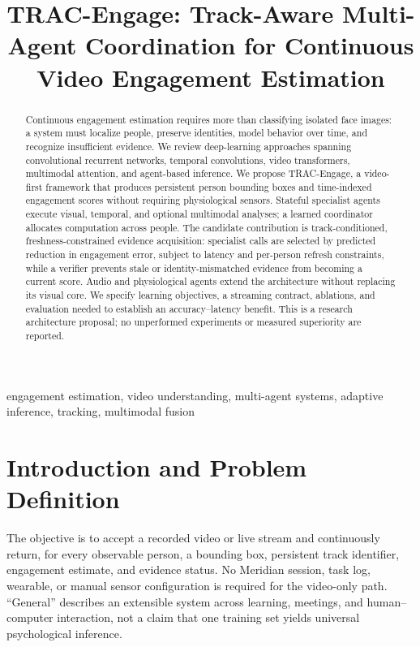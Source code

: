 \documentclass[a4paper,conference]{IEEEtran}
\title{TRAC-Engage: Track-Aware Multi-Agent Coordination for Continuous Video Engagement Estimation}
\author{\IEEEauthorblockN{Research Architecture Proposal}
\IEEEauthorblockA{Revised literature review and research implementation\\14 October 2026}}
\begin{document}
\maketitle
\begin{abstract}
Continuous engagement estimation requires more than classifying isolated face images: a system must localize people, preserve identities, model behavior over time, and recognize insufficient evidence. We review deep-learning approaches spanning convolutional recurrent networks, temporal convolutions, video transformers, multimodal attention, and agent-based inference. We propose TRAC-Engage, a video-first framework that produces persistent person bounding boxes and time-indexed engagement scores without requiring physiological sensors. Stateful specialist agents execute visual, temporal, and optional multimodal analyses; a learned coordinator allocates computation across people. The candidate contribution is track-conditioned, freshness-constrained evidence acquisition: specialist calls are selected by predicted reduction in engagement error, subject to latency and per-person refresh constraints, while a verifier prevents stale or identity-mismatched evidence from becoming a current score. Audio and physiological agents extend the architecture without replacing its visual core. We specify learning objectives, a streaming contract, ablations, and evaluation needed to establish an accuracy--latency benefit. This is a research architecture proposal; no unperformed experiments or measured superiority are reported.
\end{abstract}
\begin{IEEEkeywords}
engagement estimation, video understanding, multi-agent systems, adaptive inference, tracking, multimodal fusion
\end{IEEEkeywords}

\section{Introduction and Problem Definition}
The objective is to accept a recorded video or live stream and continuously return, for every observable person, a bounding box, persistent track identifier, engagement estimate, and evidence status. No Meridian session, task log, wearable, or manual sensor configuration is required for the video-only path. ``General'' describes an extensible system across learning, meetings, and human--computer interaction, not a claim that one training set yields universal psychological inference.
\end{document}
